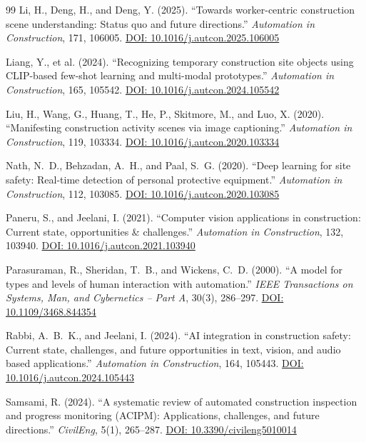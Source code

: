 \documentclass[10pt,letterpaper]{article}
\begin{document}
\begin{thebibliography}{99}
 Li, H., Deng, H., and Deng, Y. (2025). ``Towards worker-centric construction scene understanding: Status quo and future directions.'' \textit{Automation in Construction}, 171, 106005. \href{https://doi.org/10.1016/j.autcon.2025.106005}{DOI: 10.1016/j.autcon.2025.106005}

 Liang, Y., et al. (2024). ``Recognizing temporary construction site objects using CLIP-based few-shot learning and multi-modal prototypes.'' \textit{Automation in Construction}, 165, 105542. \href{https://doi.org/10.1016/j.autcon.2024.105542}{DOI: 10.1016/j.autcon.2024.105542}

 Liu, H., Wang, G., Huang, T., He, P., Skitmore, M., and Luo, X. (2020). ``Manifesting construction activity scenes via image captioning.'' \textit{Automation in Construction}, 119, 103334. \href{https://doi.org/10.1016/j.autcon.2020.103334}{DOI: 10.1016/j.autcon.2020.103334}

 Nath, N.~D., Behzadan, A.~H., and Paal, S.~G. (2020). ``Deep learning for site safety: Real-time detection of personal protective equipment.'' \textit{Automation in Construction}, 112, 103085. \href{https://doi.org/10.1016/j.autcon.2020.103085}{DOI: 10.1016/j.autcon.2020.103085}

 Paneru, S., and Jeelani, I. (2021). ``Computer vision applications in construction: Current state, opportunities \& challenges.'' \textit{Automation in Construction}, 132, 103940. \href{https://doi.org/10.1016/j.autcon.2021.103940}{DOI: 10.1016/j.autcon.2021.103940}

 Parasuraman, R., Sheridan, T.~B., and Wickens, C.~D. (2000). ``A model for types and levels of human interaction with automation.'' \textit{IEEE Transactions on Systems, Man, and Cybernetics -- Part A}, 30(3), 286--297. \href{https://doi.org/10.1109/3468.844354}{DOI: 10.1109/3468.844354}

 Rabbi, A.~B.~K., and Jeelani, I. (2024). ``AI integration in construction safety: Current state, challenges, and future opportunities in text, vision, and audio based applications.'' \textit{Automation in Construction}, 164, 105443. \href{https://doi.org/10.1016/j.autcon.2024.105443}{DOI: 10.1016/j.autcon.2024.105443}

 Samsami, R. (2024). ``A systematic review of automated construction inspection and progress monitoring (ACIPM): Applications, challenges, and future directions.'' \textit{CivilEng}, 5(1), 265--287. \href{https://doi.org/10.3390/civileng5010014}{DOI: 10.3390/civileng5010014}


\end{thebibliography}
\end{document}
